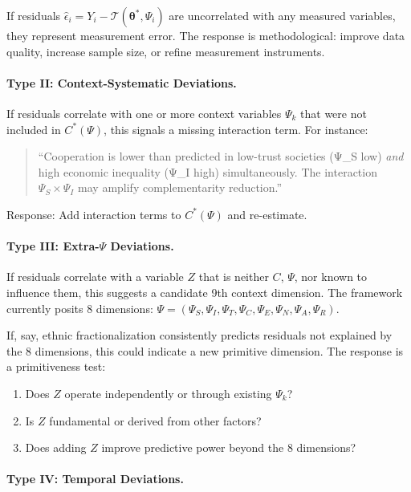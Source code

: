 \documentclass[12pt,oneside]{book}
\begin{document}
If residuals $\hat{\epsilon}_i = Y_i - \mathcal{T}(\boldsymbol{\theta}^*, \Psi_i)$ are uncorrelated
with any measured variables, they represent measurement error. The response is methodological:
improve data quality, increase sample size, or refine measurement instruments.

\paragraph{Type II: Context-Systematic Deviations.}

If residuals correlate with one or more context variables $\Psi_k$ that were not included in
$C^*(\Psi)$, this signals a missing interaction term. For instance:

\begin{quote}
``Cooperation is lower than predicted in low-trust societies (Ψ_S low) \emph{and} high
economic inequality (Ψ_I high) simultaneously. The interaction $\Psi_S \times \Psi_I$
may amplify complementarity reduction.''
\end{quote}

Response: Add interaction terms to $C^*(\Psi)$ and re-estimate.

\paragraph{Type III: Extra-$\Psi$ Deviations.}

If residuals correlate with a variable $Z$ that is neither $C$, $\Psi$, nor known to influence them,
this suggests a candidate 9th context dimension. The framework currently posits 8 dimensions:
$\Psi = (\Psi_S, \Psi_I, \Psi_T, \Psi_C, \Psi_E, \Psi_N, \Psi_A, \Psi_R)$.

If, say, ethnic fractionalization consistently predicts residuals not explained by the 8 dimensions,
this could indicate a new primitive dimension. The response is a primitiveness test:

\begin{enumerate}
  \item Does $Z$ operate independently or through existing $\Psi_k$?
  \item Is $Z$ fundamental or derived from other factors?
  \item Does adding $Z$ improve predictive power beyond the 8 dimensions?
\end{enumerate}

\paragraph{Type IV: Temporal Deviations.}
\end{document}

